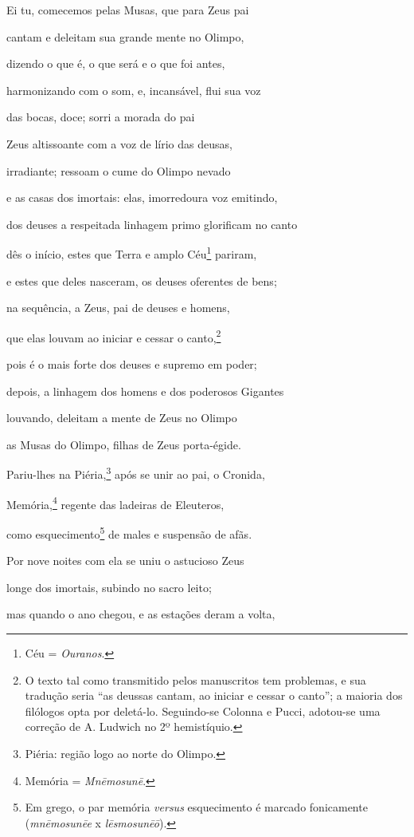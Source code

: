 \begin{pages}
\begin{Rightside}
Ei tu, comecemos pelas Musas, que para Zeus pai

cantam e deleitam sua grande mente no Olimpo,

dizendo o que é, o que será e o que foi antes,

harmonizando com o som, e, incansável, flui sua voz

das bocas, doce; sorri a morada do pai 

Zeus altissoante com a voz de lírio das deusas,

irradiante; ressoam o cume do Olimpo nevado

e as casas dos imortais: elas, imorredoura voz emitindo,

dos deuses a respeitada linhagem primo glorificam no canto

dês o início, estes que Terra e amplo Céu\footnote{Céu = \emph{Ouranos}.} pariram, 

e estes que deles nasceram, os deuses oferentes de bens;

na sequência, a Zeus, pai de deuses e homens,

que elas louvam ao iniciar e cessar o canto,\footnote{O texto tal como transmitido pelos manuscritos tem problemas, e sua
tradução seria ``as deussas cantam, ao iniciar e cessar o canto''; a
maioria dos filólogos opta por deletá-lo. Seguindo-se Colonna e Pucci,
adotou-se uma correção de A. Ludwich no 2º hemistíquio.}

pois é o mais forte dos deuses e supremo em poder;

depois, a linhagem dos homens e dos poderosos Gigantes 

louvando, deleitam a mente de Zeus no Olimpo

as Musas do Olimpo, filhas de Zeus porta-égide.

\quad{}Pariu-lhes na Piéria,\footnote{Piéria: região logo ao norte do Olimpo.} após se unir ao pai, o Cronida,

Memória,\footnote{Memória = \emph{Mnēmosunē}.} regente das ladeiras de Eleuteros,

como esquecimento\footnote{Em grego, o par memória \emph{versus} esquecimento é marcado fonicamente (\emph{mnēmosunēe} x \emph{lēsmosunēō}).} de males e suspensão de afãs. 

Por nove noites com ela se uniu o astucioso Zeus

longe dos imortais, subindo no sacro leito;

mas quando o ano chegou, e as estações deram a volta,


\end{Rightside}
\end{pages}
